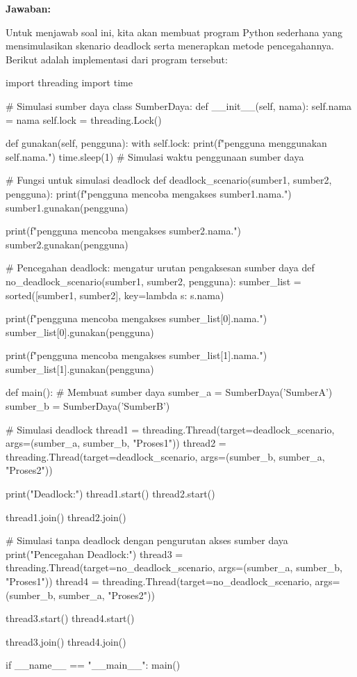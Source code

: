 \documentclass[12pt]{article}
\begin{document}
    \textbf{Jawaban:} \par Untuk menjawab soal ini, kita akan membuat program Python sederhana yang mensimulasikan skenario deadlock serta menerapkan metode pencegahannya. Berikut adalah implementasi dari program tersebut:
    \begin{python}
    import threading
    import time
    
    # Simulasi sumber daya
    class SumberDaya:
        def __init__(self, nama):
            self.nama = nama
            self.lock = threading.Lock()
    
    def gunakan(self, pengguna):
        with self.lock:
            print(f"{pengguna} menggunakan {self.nama}.")
            time.sleep(1)  # Simulasi waktu penggunaan sumber daya

    # Fungsi untuk simulasi deadlock
    def deadlock_scenario(sumber1, sumber2, pengguna):
        print(f"{pengguna} mencoba mengakses {sumber1.nama}.")
        sumber1.gunakan(pengguna)
    
        print(f"{pengguna} mencoba mengakses {sumber2.nama}.")
        sumber2.gunakan(pengguna)
    
    # Pencegahan deadlock: mengatur urutan pengaksesan sumber daya
    def no_deadlock_scenario(sumber1, sumber2, pengguna):
        sumber_list = sorted([sumber1, sumber2], key=lambda s: s.nama)
        
        print(f"{pengguna} mencoba mengakses {sumber_list[0].nama}.")
        sumber_list[0].gunakan(pengguna)
    
        print(f"{pengguna} mencoba mengakses {sumber_list[1].nama}.")
        sumber_list[1].gunakan(pengguna)
    
    def main():
        # Membuat sumber daya
        sumber_a = SumberDaya('SumberA')
        sumber_b = SumberDaya('SumberB')

    # Simulasi deadlock
    thread1 = threading.Thread(target=deadlock_scenario, args=(sumber_a, sumber_b, "Proses1"))
    thread2 = threading.Thread(target=deadlock_scenario, args=(sumber_b, sumber_a, "Proses2"))

    print("\nSimulasi Deadlock:")
    thread1.start()
    thread2.start()
    
    thread1.join()
    thread2.join()

    # Simulasi tanpa deadlock dengan pengurutan akses sumber daya
    print("\nSimulasi Pencegahan Deadlock:")
    thread3 = threading.Thread(target=no_deadlock_scenario, args=(sumber_a, sumber_b, "Proses1"))
    thread4 = threading.Thread(target=no_deadlock_scenario, args=(sumber_b, sumber_a, "Proses2"))

    thread3.start()
    thread4.start()
    
    thread3.join()
    thread4.join()

    if __name__ == "__main__":
        main()

    \end{python}
\end{document}
